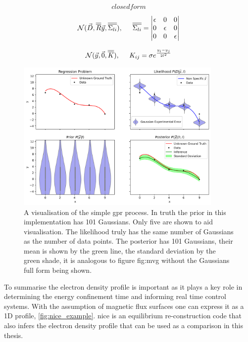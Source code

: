 \begin{equation}
  closed form
  \label{eq:closedform}
\end{equation}

\begin{equation}
    \mathcal{N}(\Vec{D}, \overline{\overline{R}}\Vec{y}, \overline{\overline{\Sigma_{li}}}),\hspace{0.5cm} \overline{\overline{\Sigma_{li}}} = 
      \begin{vmatrix}
          \epsilon & 0 & 0\\
          0 & \epsilon & 0\\
          0 & 0 & \epsilon
      \end{vmatrix}
    \label{eq:likelihood}
\end{equation}

\begin{equation}
  \mathcal{N}(\Vec{y}, \Vec{0}, \overline{\overline{K}}),\hspace{0.5cm} K_{ij} = \sigma e^{\frac{y_i - y_j}{2l^2}}
  \label{eq:prior}
\end{equation}

\begin{figure}
  \centering
  \includegraphics[width=10cm]{images/gprvis.png}
  \caption{A visualisation of the simple \gls{gpr} process. In truth the prior in this implementation has 101 Gaussians. Only five are shown to aid visualisation. The likelihood truly has the same number of Gaussians as the number of data points. The posterior has 101 Gaussians, their mean is shown by the green line, the standard deviation by the green shade, it is analogous to figure fig:mvg without the Gaussians full form being shown.}
  \label{fig:gprvis}
\end{figure}


To summarise the electron density profile is important as it plays a key role in determining the energy confinement time and informing real time control systems. With the assumption of magnetic flux surfaces one can express it as a 1D profile, \ref{fig:nice_example}. \gls{nice} is an equilibrium re-construction code that also infers the electron density profile that can be used as a comparison in this thesis. 

